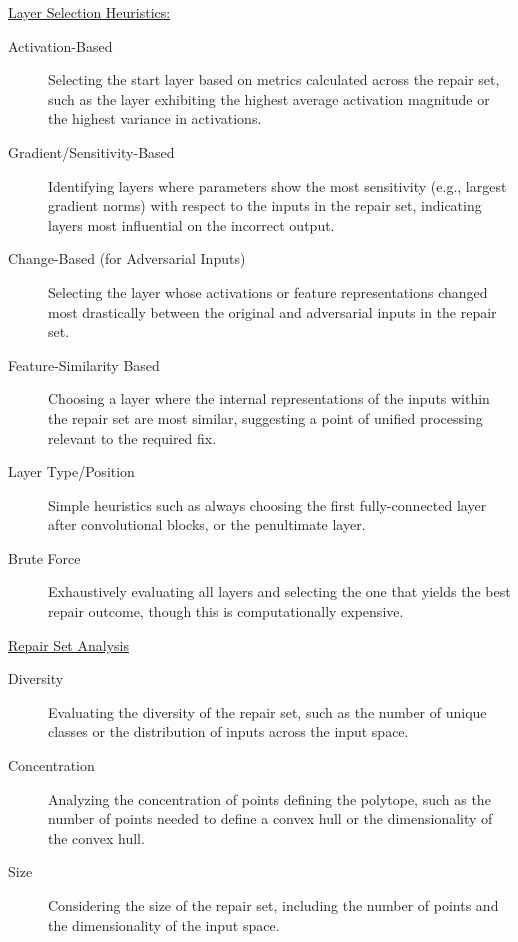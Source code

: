 \documentclass{article}
\begin{document}
\underline{Layer Selection Heuristics:}
\begin{description}
    \item[Activation-Based] Selecting the start layer based on metrics calculated across the repair set, such as the layer exhibiting the highest average activation magnitude or the highest variance in activations.
    \item[Gradient/Sensitivity-Based] Identifying layers where parameters show the most sensitivity (e.g., largest gradient norms) with respect to the inputs in the repair set, indicating layers most influential on the incorrect output.
    \item[Change-Based (for Adversarial Inputs)] Selecting the layer whose activations or feature representations changed most drastically between the original and adversarial inputs in the repair set.
    \item[Feature-Similarity Based] Choosing a layer where the internal representations of the inputs within the repair set are most similar, suggesting a point of unified processing relevant to the required fix.
    \item[Layer Type/Position] Simple heuristics such as always choosing the first fully-connected layer after convolutional blocks, or the penultimate layer.
    \item[Brute Force] Exhaustively evaluating all layers and selecting the one that yields the best repair outcome, though this is computationally expensive.
\end{description}

\underline{Repair Set Analysis}
\begin{description}
    \item[Diversity] Evaluating the diversity of the repair set, such as the number of unique classes or the distribution of inputs across the input space.
    \item[Concentration] Analyzing the concentration of points defining the polytope, such as the number of points needed to define a convex hull or the dimensionality of the convex hull.
    \item[Size] Considering the size of the repair set, including the number of points and the dimensionality of the input space.
\end{description}
\end{document}
